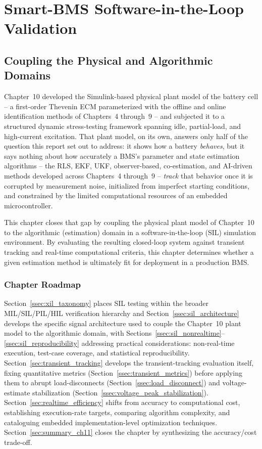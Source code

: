 \chapter{Smart-BMS Software-in-the-Loop Validation}
\label{chap:sil_validation}

\section{Coupling the Physical and Algorithmic Domains}
\label{sec:sil_coupling}

Chapter~10 developed the Simulink-based physical plant model of the battery cell -- a first-order Thevenin ECM parameterized with the offline and online identification methods of Chapters~4 through~9 -- and subjected it to a structured dynamic stress-testing framework spanning idle, partial-load, and high-current excitation. That plant model, on its own, answers only half of the question this report set out to address: it shows how a battery \emph{behaves}, but it says nothing about how accurately a BMS's parameter and state estimation algorithms -- the RLS, EKF, UKF, observer-based, co-estimation, and AI-driven methods developed across Chapters~4 through~9 -- \emph{track} that behavior once it is corrupted by measurement noise, initialized from imperfect starting conditions, and constrained by the limited computational resources of an embedded microcontroller. 

This chapter closes that gap by coupling the physical plant model of Chapter~10 to the algorithmic (estimation) domain in a software-in-the-loop (SIL) simulation environment. By evaluating the resulting closed-loop system against transient tracking and real-time computational criteria, this chapter determines whether a given estimation method is ultimately fit for deployment in a production BMS.

\subsection{Chapter Roadmap}
\label{ssec:ch11_roadmap}

Section~\ref{ssec:xil_taxonomy} places SIL testing within the broader MIL/SIL/PIL/HIL verification hierarchy and Section~\ref{ssec:sil_architecture} develops the specific signal architecture used to couple the Chapter~10 plant model to the algorithmic domain, with Sections~\ref{ssec:sil_nonrealtime}--\ref{ssec:sil_reproducibility} addressing practical considerations: non-real-time execution, test-case coverage, and statistical reproducibility. Section~\ref{sec:transient_tracking} develops the transient-tracking evaluation itself, fixing quantitative metrics (Section~\ref{ssec:transient_metrics}) before applying them to abrupt load-disconnects (Section~\ref{ssec:load_disconnect}) and voltage-estimate stabilization (Section~\ref{ssec:voltage_peak_stabilization}). Section~\ref{sec:realtime_efficiency} shifts from accuracy to computational cost, establishing execution-rate targets, comparing algorithm complexity, and cataloguing embedded implementation-level optimization techniques. Section~\ref{sec:summary_ch11} closes the chapter by synthesizing the accuracy/cost trade-off.

